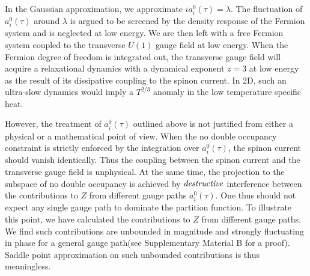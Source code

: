 \documentclass[12pt]{article}
\begin{document}
In the Gaussian approximation, we approximate $ia^{0}_{i}(\tau)=\lambda$. The fluctuation of $a^{0}_{i}(\tau)$ around $\lambda$ is argued to be screened by the density response of the Fermion system and is neglected at low energy\cite{PALee2}. We are then left with a free Fermion system coupled to the transverse $U(1)$ gauge field at low energy. When the Fermion degree of freedom is integrated out, the transverse gauge field will acquire a relaxational dynamics with a dynamical exponent $z=3$ at low energy as the result of its dissipative coupling to the spinon current. In 2D, such an ultra-slow dynamics would imply a $T^{2/3}$ anomaly in the low temperature specific heat.
   
However, the treatment of $a^{0}_{i}(\tau)$ outlined above is not justified from either a physical or a mathematical point of view. When the no double occupancy constraint is strictly enforced by the integration over $a^{0}_{i}(\tau)$, the spinon current should vanish identically. Thus the coupling between the spinon current and the transverse gauge field is unphysical. At the same time, the projection to the subspace of no double occupancy is achieved by $\it{destructive}$ interference between the contributions to $Z$ from different gauge paths $a^{0}_{i}(\tau)$. One thus should not expect any single gauge path to dominate the partition function. To illustrate this point, we have calculated the contributions to $Z$ from different gauge paths. We find such contributions are unbounded in magnitude and strongly fluctuating in phase for a general gauge path(see Supplementary Material B for a proof). Saddle point approximation on such unbounded contributions is thus meaningless. 
\end{document}
